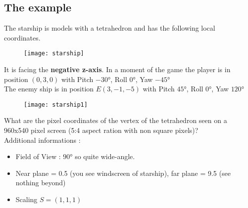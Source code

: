 \subsection{The example}
The starship is models with a tetrahedron and has the following local coordinates.
\begin{figure}[H]
  \centering
  \texttt{[image: starship]}
\end{figure}
It is facing the \textbf{negative z-axis}.\newpage
In a moment of the game the player is in position $(0,3,0)$ with
Pitch $\ang{-30}$,
Roll $\ang{0}$,
Yaw $\ang{-45}$\\
The enemy ship is in position $E(3,-1,-5)$ with
Pitch $\ang{45}$,
Roll $\ang{0}$,
Yaw $\ang{120}$
\begin{figure}[H]
  \centering
  \texttt{[image: starship1]}
\end{figure}
What are the pixel coordinates of the vertex of the tetrahedron seen on  a 960x540 pixel screen (5:4 aspect ration with non square pixels)?\\
Additional informations : 
\begin{itemize}
\item Field of View : $\ang{90}$ so quite wide-angle.
\item Near plane = 0.5 (you see windscreen of starship), far plane = 9.5 (see nothing beyond)
\item Scaling $S=(1,1,1)$
\end{itemize} 

